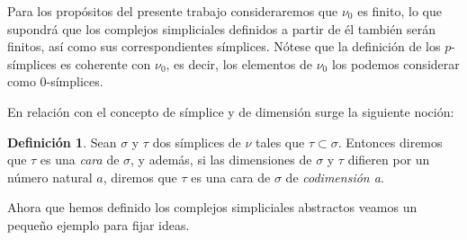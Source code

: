 \documentclass[12pt, a4paper, twoside]{book}
\numberwithin{equation}{section}
\theoremstyle{definition}
\newtheorem{defi}{Definición}[section]
\theoremstyle{remark}
\theoremstyle{plain}
\begin{document}
	Para los propósitos del presente trabajo consideraremos que 
	{\Large $\nu$}$_{0}$ es finito, lo que supondrá que los complejos 
	simpliciales definidos a partir de él también serán finitos, así como 
	sus correspondientes símplices. Nótese que la definición de los 
	$p$-símplices es coherente con {\Large $\nu$}$_{0}$, es decir, los 
	elementos de {\Large $\nu$}$_{0}$ los podemos considerar como 
	$0$-símplices. 
	
	En relación con el concepto de símplice y de dimensión surge la 
	siguiente noción: 

	\begin{defi}
		Sean $\sigma$ y $\tau$ dos símplices de {\Large $\nu$} tales 
		que $\tau \subset \sigma$. Entonces diremos que $\tau$ es una 
		\textit{cara} de $\sigma$, y además, si las dimensiones de 
		$\sigma$ y $\tau$ difieren por un número natural $a$, 
		diremos que $\tau$ es una cara de $\sigma$ de 
		\textit{codimensión a}.
	\end{defi}

	Ahora que hemos definido los complejos simpliciales abstractos veamos 
	un pequeño ejemplo para fijar ideas.
\end{document}
